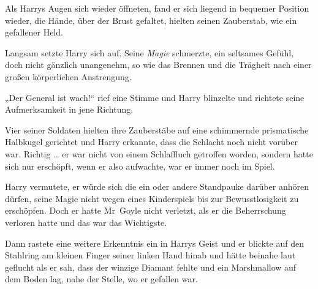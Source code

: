 \later

Als Harrys Augen sich wieder öffneten, fand er sich liegend in bequemer Position wieder, die Hände, über der Brust gefaltet, hielten seinen Zauberstab, wie ein gefallener Held.

Langsam setzte Harry sich auf. Seine \emph{Magie} schmerzte, ein seltsames Gefühl, doch nicht gänzlich unangenehm, so wie das Brennen und die Trägheit nach einer großen körperlichen Anstrengung.

„Der General ist wach!“ rief eine Stimme und Harry blinzelte und richtete seine Aufmerksamkeit in jene Richtung.

Vier seiner Soldaten hielten ihre Zauberstäbe auf eine schimmernde prismatische Halbkugel gerichtet und Harry erkannte, dass die Schlacht noch nicht vorüber war. Richtig … er war nicht von einem Schlaffluch getroffen worden, sondern hatte sich nur erschöpft, wenn er also aufwachte, war er immer noch im Spiel.

Harry vermutete, er würde sich die ein oder andere Standpauke darüber anhören dürfen, seine Magie nicht wegen eines Kinderspiels bis zur Bewusstlosigkeit zu erschöpfen. Doch er hatte Mr~Goyle nicht verletzt, als er die Beherrschung verloren hatte und das war das Wichtigste.

Dann rastete eine weitere Erkenntnis ein in Harrys Geist und er blickte auf den Stahlring am kleinen Finger seiner linken Hand hinab und hätte beinahe laut geflucht als er sah, dass der winzige Diamant fehlte und ein Marshmallow auf dem Boden lag, nahe der Stelle, wo er gefallen war.

